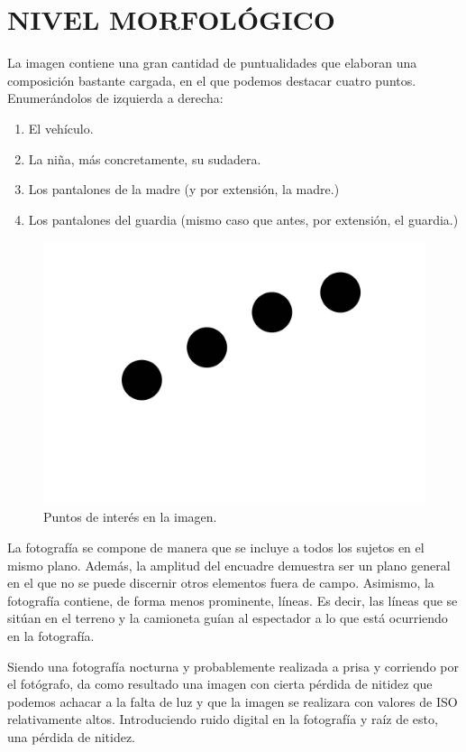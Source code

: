 \documentclass[11pt]{article}
\begin{document}
\section{NIVEL MORFOLÓGICO}
La imagen contiene una gran cantidad de puntualidades que elaboran una composición bastante cargada, en el que podemos destacar cuatro puntos. Enumerándolos de izquierda a derecha:
\begin{enumerate}
	\item El vehículo.
	\item La niña, más concretamente, su sudadera.
	\item Los pantalones de la madre (y por extensión, la madre.)
	\item Los pantalones del guardia (mismo caso que antes, por extensión, el guardia.)
\end{enumerate}

\begin{figure}[H]
	\includegraphics[scale = 0.3]{Images/dot.png}
	\caption{Puntos de interés en la imagen.}
\end{figure}

La fotografía se compone de manera que se incluye a todos los sujetos en el mismo plano. Además, la amplitud del encuadre demuestra ser un plano general en el que no se puede discernir otros elementos fuera de campo. Asimismo, la fotografía contiene, de forma menos prominente, líneas. Es decir, las líneas que se sitúan en el terreno y la camioneta guían al espectador a lo que está ocurriendo en la fotografía. \newline 

Siendo una fotografía nocturna y probablemente realizada a prisa y corriendo por el fotógrafo, da como resultado una imagen con cierta pérdida de nitidez que podemos achacar a la falta de luz y que la imagen se realizara con valores de ISO relativamente altos. Introduciendo ruido digital en la fotografía y raíz de esto, una pérdida de nitidez. \newline
\end{document}
